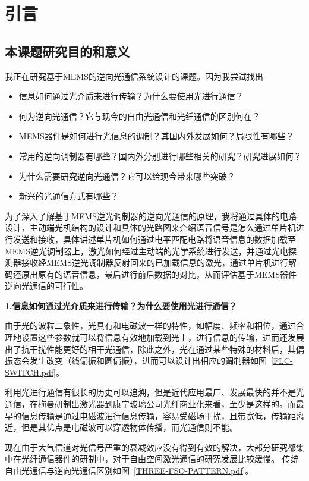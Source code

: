 \chapter{引言}\label{chap:introduction}

\section{本课题研究目的和意义}
我正在研究基于MEMS的逆向光通信系统设计的课题。因为我尝试找出
\begin{itemize}
	\item 信息如何通过光介质来进行传输？为什么要使用光进行通信？
	\item 何为逆向光通信？它与现今的自由光通信和光纤通信的区别何在？
	\item MEMS器件是如何进行光信息的调制？其国内外发展如何？局限性有哪些？
	\item 常用的逆向调制器有哪些？国内外分别进行哪些相关的研究？研究进展如何？
	\item 为什么需要研究逆向光通信？它可以给现今带来哪些突破？
	\item 新兴的光通信方式有哪些？
\end{itemize}

为了深入了解基于MEMS逆光调制器的逆向光通信的原理，我将通过具体的电路设计，主动端光机结构的设计和具体的光路图来介绍语音信号是怎么通过单片机进行发送和接收，具体讲述单片机如何通过电平匹配电路将语音信息的数据加载至MEMS逆光调制器上，激光如何经过主动端的光学系统进行发送，并通过光电探测器接收经MEMS逆光调制器反射回来的已加载信息的激光，通过单片机进行解码还原出原有的语音信息，最后进行前后数据的对比，从而评估基于MEMS器件逆向光通信的可行性。

\textbf{1.信息如何通过光介质来进行传输？为什么要使用光进行通信？}

由于光的波粒二象性，光具有和电磁波一样的特性，如幅度、频率和相位，通过合理地设置这些参数就可以将信息有效地加载到光上，进行信息的传输，进而还发展出了抗干扰性能更好的相干光通信\citep{Honghui.2013}，除此之外，光在通过某些特殊的材料后，其偏振态会发生改变（线偏振和圆偏振），进而可以设计出相应的调制器如图~\ref{FLC-SWITCH.pdf}。

利用光进行通信有很长的历史可以追溯，但是近代应用最广、发展最快的并不是光通信，在梅曼研制出激光器到康宁玻璃公司光纤商业化来看，至少是这样的。而最早的信息传输是通过电磁波进行信息传输，容易受磁场干扰，且带宽低，传输距离近，但是其优点是电磁波可以穿透物体传播，而光通信则不能。

现在由于大气信道对光信号严重的衰减效应没有得到有效的解决，大部分研究都集中在光纤通信器件的研制中，对于自由空间激光通信的研究发展比较缓慢。
传统自由光通信\citep{白帅.2015, 姜会林.2015}与逆向光通信区别如图~\ref{THREE-FSO-PATTERN.pdf}。

